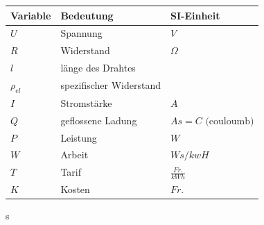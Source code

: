 \documentclass[
a4paper,
oneside,
landscape, 
8pt,
]{scrartcl}
\begin{document}
\begin{multicols*}{2}
\begin{tabbing}
	\begin{tabu} to \linewidth {l X l}
		Variable & Bedeutung & SI-Einheit \\
		\midrule
		$U$ & Spannung & $V$ \\
		$R$ & Widerstand & $\Omega$ \\
		$l$ & länge des Drahtes & \\
		$\rho_{el}$ & spezifischer Widerstand & \\
		$I$ & Stromstärke & $A$ \\
		$Q$ & geflossene Ladung & $As = C \text{ (couloumb)}$ \\
		$P$ & Leistung & $W$ \\	
		$W$ & Arbeit & $Ws / kwH$ \\
		$T$ & Tarif & $\frac{Fr.}{kWh}$ \\
		$K$ & Kosten & $Fr.$ \\
		\bottomrule
	\end{tabu}s
\end{tabbing}


\end{multicols*}
\end{document}
